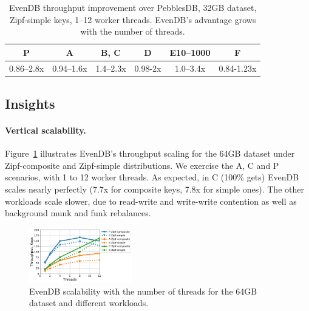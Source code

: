 \documentclass[sigplan,10pt]{acmart}
\newcommand{\sys}{EvenDB}
\providecommand{\DIFaddbeginFL}{} %
\providecommand{\DIFaddendFL}{} %
\providecommand{\DIFdelbeginFL}{} %
\providecommand{\DIFdelendFL}{} %
\begin{document}
\begin{table}
\centering
\small{
\begin{tabular}{cccccc}
P & A & B, C & D& E10--1000 & F \\
\hline 
0.86--2.8x & 0.94--1.6x & 1.4--2.3x &  0.98-2x & 1.0--3.4x &  0.84-1.23x  \\
\end{tabular}
}
\caption{\sys\/ throughput improvement over PebblesDB, 32GB dataset, Zipf-simple keys, 1--12 worker threads.
\sys's advantage grows with the number of threads.}
\label{fig:pebbels-throughput}
\end{table}

\subsection{Insights}
\label{ssec:drill} 

\paragraph{Vertical scalability.} 
Figure~\ref{fig:scalability} illustrates \sys's throughput scaling for the 64GB dataset under Zipf-composite and Zipf-simple  
distributions. We exercise the A, C and P scenarios, with 1 to 12 worker threads.  
As expected, in C (100\% gets) \sys\/ scales nearly perfectly (7.7x for composite keys, 7.8x for simple ones). 
The other workloads scale slower, due to read-write and write-write contention as well as background munk and funk rebalances. 

\begin{figure}[th]
\centering
\includegraphics[width=0.4\textwidth]{figs/scalability_line.pdf}

\caption{{\sys\/ scalability with the number of threads for 
the 64GB dataset and different workloads. }}
\label{fig:scalability}
\end{figure}
\end{document}
